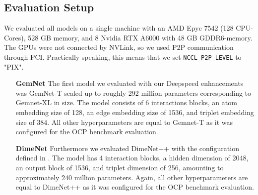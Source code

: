 \subsection{Evaluation Setup}

We evaluated all models on a single machine with an AMD Epyc 7542 (128 CPU-Cores), 528 GB memory, 
and 8 Nvidia RTX A6000 with 48 GB GDDR6-memory. The GPUs were not connected by NVLink, so we used 
P2P communication through PCI. Practically speaking, this means that we set \texttt{NCCL\_P2P\_LEVEL} to 
"PIX".

\begin{enumerate}[align=left]
    \item[\textbf{GemNet}] The first model we evaluated with our Deepspeed enhancements was GemNet-T 
    scaled up to roughly 292 million parameters corresponding to Gemnet-XL\cite*{https://doi.org/10.48550/arxiv.2203.09697}
    in size. The model consists of 6 interactions blocks, an atom embedding size of 128, an edge 
    embedding size of 1536, and triplet embedding size of 384. All other hyperparameters are equal 
    to Gemnet-T as it was configured for the OCP benchmark evaluation.

    \item[\textbf{DimeNet}] Furthermore we evaluated DimeNet++ with the configuration defined in 
    \cite*{https://doi.org/10.48550/arxiv.2203.09697}. The model has 4 interaction blocks, a hidden 
    dimension of 2048, an output block of 1536, and triplet dimension of 256, amounting to approximately 
    240 million parameters. Again, all other hyperparameters are equal to DimeNet++ as it was configured 
    for the OCP benchmark evaluation.
\end{enumerate}




